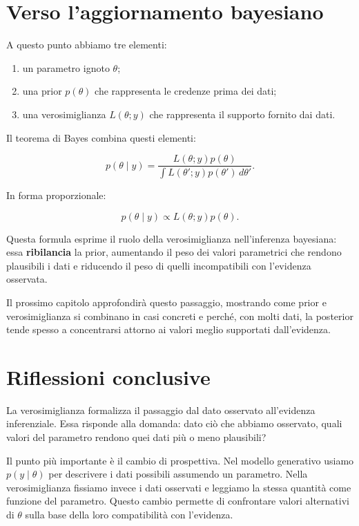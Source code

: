\documentclass[
  italian,
  letterpaper,
  a4paper,
  11pt,
  open=any]{scrbook}
\providecommand{\tightlist}{%
  \setlength{\itemsep}{0pt}\setlength{\parskip}{0pt}}
\theoremstyle{plain}
\theoremstyle{definition}
\theoremstyle{definition}
\theoremstyle{remark}
\begin{document}
\section{Verso l'aggiornamento
bayesiano}\label{sec-likelihood-to-posterior}

A questo punto abbiamo tre elementi:

\begin{enumerate}
\def\labelenumi{\arabic{enumi}.}
\tightlist
\item
  un parametro ignoto \(\theta\);
\item
  una prior \(p(\theta)\) che rappresenta le credenze prima dei dati;
\item
  una verosimiglianza \(L(\theta; y)\) che rappresenta il supporto
  fornito dai dati.
\end{enumerate}

Il teorema di Bayes combina questi elementi:

\[
p(\theta \mid y)
= \frac{L(\theta; y)p(\theta)}{\int L(\theta'; y)p(\theta')\,d\theta'}.
\]

In forma proporzionale:

\[
p(\theta \mid y) \propto L(\theta; y)p(\theta).
\]

Questa formula esprime il ruolo della verosimiglianza nell'inferenza
bayesiana: essa \textbf{ribilancia} la prior, aumentando il peso dei
valori parametrici che rendono plausibili i dati e riducendo il peso di
quelli incompatibili con l'evidenza osservata.

Il prossimo capitolo approfondirà questo passaggio, mostrando come prior
e verosimiglianza si combinano in casi concreti e perché, con molti
dati, la posterior tende spesso a concentrarsi attorno ai valori meglio
supportati dall'evidenza.

\section*{Riflessioni conclusive}\label{riflessioni-conclusive-13}


La verosimiglianza formalizza il passaggio dal dato osservato
all'evidenza inferenziale. Essa risponde alla domanda: dato ciò che
abbiamo osservato, quali valori del parametro rendono quei dati più o
meno plausibili?

Il punto più importante è il cambio di prospettiva. Nel modello
generativo usiamo \(p(y \mid \theta)\) per descrivere i dati possibili
assumendo un parametro. Nella verosimiglianza fissiamo invece i dati
osservati e leggiamo la stessa quantità come funzione del parametro.
Questo cambio permette di confrontare valori alternativi di \(\theta\)
sulla base della loro compatibilità con l'evidenza.
\end{document}
